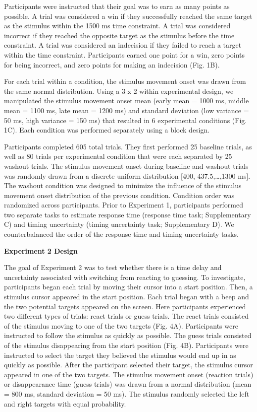 \documentclass[12pt,letterpaper]{article}
\begin{document}
Participants were instructed that their goal was to earn as many points as possible. A trial was considered a win if they successfully reached the same target as the stimulus within the 1500 ms time constraint. A trial was considered incorrect if they reached the opposite target as the stimulus before the time constraint. A trial was considered an indecision if they failed to reach a target within the time constraint. Participants earned one point for a win, zero points for being incorrect, and zero points for making an indecision (Fig. 1B).

For each trial within a condition, the stimulus movement onset was drawn from the same normal distribution. Using a 3 x 2 within experimental design, we manipulated the stimulus movement onset mean (early mean = 1000 ms, middle mean = 1100 ms, late mean = 1200 ms) and standard deviation (low variance = 50 ms, high variance = 150 ms) that resulted in 6 experimental conditions (Fig. 1C).  Each condition was performed separately using a block design.

Participants completed 605 total trials. They first performed 25 baseline trials, as well as 80 trials per experimental condition that were each separated by 25 washout trials. The stimulus movement onset during baseline and washout trials was randomly drawn from a discrete uniform distribution [400, 437.5,…,1300 ms]. The washout condition was designed to minimize the influence of the stimulus movement onset distribution of the previous condition. Condition order was randomized across participants.
Prior to Experiment 1, participants performed two separate tasks to estimate response time (response time task; Supplementary C) and timing uncertainty (timing uncertainty task; Supplementary D). We counterbalanced the order of the response time and timing uncertainty tasks.

\noindent\textbf{\large\textcolor{mydarkblue}{Experiment 2 Design}}

The goal of Experiment 2 was to test whether there is a time delay and uncertainty associated with switching from reacting to guessing. To investigate, participants began each trial by moving their cursor into a start position. Then, a stimulus cursor appeared in the start position. Each trial began with a beep and the two potential targets appeared on the screen. Here participants experienced two different types of trials: react trials or guess trials. The react trials consisted of the stimulus moving to one of the two targets (Fig. 4A). Participants were instructed to follow the stimulus as quickly as possible. The guess trials consisted of the stimulus disappearing from the start position (Fig. 4B). Participants were instructed to select the target they believed the stimulus would end up in as quickly as possible. After the participant selected their target, the stimulus cursor appeared in one of the two targets. The stimulus movement onset (reaction trials) or disappearance time (guess trials) was drawn from a normal distribution (mean = 800 ms, standard deviation = 50 ms).  The stimulus randomly selected the left and right targets with equal probability.
\end{document}
